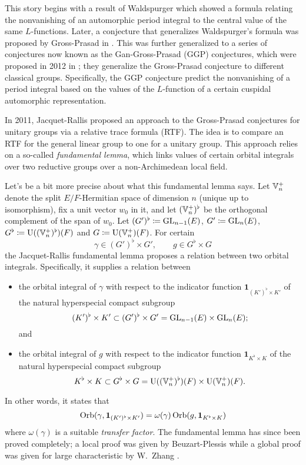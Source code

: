 This story begins with a result of
Waldspurger \cite{ref:waldspurger} which showed a formula
relating the nonvanishing of an automorphic period integral
to the central value of the same $L$-functions.
Later, a conjecture that generalizes Waldspurger's formula
was proposed by Gross-Prasad in \cite{ref:GP1,ref:GP2}.
This was further generalized to a series of conjectures
now known as the Gan-Gross-Prasad (GGP) conjectures,
which were proposed in 2012 in \cite{ref:GGP};
they generalize the Gross-Prasad conjecture to different classical groups.
Specifically, the GGP conjecture predict the nonvanishing of a period integral
based on the values of the $L$-function of a certain cuspidal automorphic representation.

In 2011, Jacquet-Rallis \cite{ref:JR} proposed an approach to the Gross-Prasad conjectures
for unitary groups via a relative trace formula (RTF).
The idea is to compare an RTF for the general linear group to one for a unitary group.
This approach relies on a so-called \emph{fundamental lemma},
which links values of certain orbital integrals
over two reductive groups over a non-Archimedean local field.

Let's be a bit more precise about what this fundamental lemma says.
Let $\mathbb V_n^+$ denote the split $E/F$-Hermitian space of dimension $n$ (unique up to isomorphism),
fix a unit vector $w_0$ in it,
and let $(\mathbb V_n^+)^\flat$ be the orthogonal complement of the span of $w_0$.
Let $(G')^\flat \coloneqq \operatorname{GL}_{n-1}(E)$, $G' \coloneqq \operatorname{GL}_n(E)$,
$G^\flat \coloneqq \operatorname{U}((\mathbb V_n^+)^\flat)(F)$ and $G \coloneqq \operatorname{U}(\mathbb V_n^+)(F)$.
For certain
\[ \gamma \in (G')^\flat \times G', \qquad g \in G^\flat \times G \]
the Jacquet-Rallis fundamental lemma proposes a relation between two orbital integrals.
Specifically, it supplies a relation between
\begin{itemize}
\item the orbital integral of $\gamma$ with respect to
  the indicator function $\mathbf{1}_{(K')^\flat \times K'}$
  of the natural hyperspecial compact subgroup
  \[ (K')^\flat \times K' \subset (G')^\flat \times G' = \operatorname{GL}_{n-1}(E) \times \operatorname{GL}_n(E); \]
  and
\item the orbital integral of $g$ with respect to
  the indicator function $\mathbf{1}_{K^\flat \times K}$
  of the natural hyperspecial compact subgroup
  \[ K^\flat \times K \subset G^\flat \times G = \operatorname{U}((\mathbb V_n^+)^\flat)(F) \times \operatorname{U}(\mathbb V_n^+)(F). \]
\end{itemize}
In other words, it states that
\begin{equation}
  \operatorname{Orb}(\gamma, \mathbf{1}_{(K')^\flat \times K'}) = \omega(\gamma) \operatorname{Orb}(g, \mathbf{1}_{K^\flat \times K})
  \label{eq:old_FL}
\end{equation}
where $\omega(\gamma)$ is a suitable \emph{transfer factor}.
The fundamental lemma has since been proved completely;
a local proof was given by Beuzart-Plessis \cite{ref:BeuzartPlessis}
while a global proof was given for large characteristic by W.\ Zhang \cite{ref:Wei2021}.

